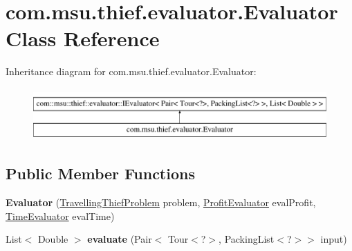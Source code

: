 \hypertarget{classcom_1_1msu_1_1thief_1_1evaluator_1_1Evaluator}{\section{com.\-msu.\-thief.\-evaluator.\-Evaluator Class Reference}
\label{classcom_1_1msu_1_1thief_1_1evaluator_1_1Evaluator}
}
Inheritance diagram for com.\-msu.\-thief.\-evaluator.\-Evaluator\-:\begin{figure}[H]
\begin{center}
\leavevmode
\includegraphics[height=2.000000cm]{classcom_1_1msu_1_1thief_1_1evaluator_1_1Evaluator}
\end{center}
\end{figure}
\subsection*{Public Member Functions}
\begin{DoxyCompactItemize}
\item 
\hypertarget{classcom_1_1msu_1_1thief_1_1evaluator_1_1Evaluator_a788b3eae58a8a6ac94080b1950418940}{{\bfseries Evaluator} (\hyperlink{classcom_1_1msu_1_1thief_1_1problems_1_1TravellingThiefProblem}{Travelling\-Thief\-Problem} problem, \hyperlink{classcom_1_1msu_1_1thief_1_1evaluator_1_1profit_1_1ProfitEvaluator}{Profit\-Evaluator} eval\-Profit, \hyperlink{classcom_1_1msu_1_1thief_1_1evaluator_1_1time_1_1TimeEvaluator}{Time\-Evaluator} eval\-Time)}\label{classcom_1_1msu_1_1thief_1_1evaluator_1_1Evaluator_a788b3eae58a8a6ac94080b1950418940}

\item 
\hypertarget{classcom_1_1msu_1_1thief_1_1evaluator_1_1Evaluator_aec1e3a841ab1a5a10ba95b41ae83ac19}{List$<$ Double $>$ {\bfseries evaluate} (Pair$<$ Tour$<$?$>$, Packing\-List$<$?$>$$>$ input)}\label{classcom_1_1msu_1_1thief_1_1evaluator_1_1Evaluator_aec1e3a841ab1a5a10ba95b41ae83ac19}

\end{DoxyCompactItemize}
